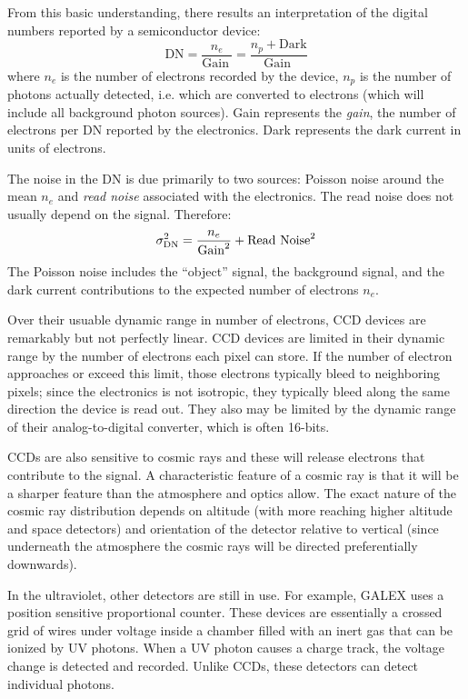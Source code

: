 From this basic understanding, there results an interpretation of the
digital numbers reported by a semiconductor device:
\begin{equation}
\mathrm{DN} =
\frac{n_e}{\mathrm{Gain~}} = 
\frac{n_p + \mathrm{Dark}}
{\mathrm{Gain~}}
\end{equation}
where $n_e$ is the number of electrons recorded by the device, $n_p$
is the number of photons actually detected, i.e. which are converted
to electrons (which will include all background photon sources). Gain
represents the {\it gain}, the number of electrons per DN reported by
the electronics. Dark represents the dark current in units of
electrons.

The noise in the DN is due primarily to two sources: Poisson noise
around the mean $n_e$ and {\it read noise} associated with the
electronics. The read noise does not usually depend on the
signal. Therefore:
\begin{equation}
\sigma_{\rm DN}^2 = \frac{n_e}{\mathrm{Gain}^2} + \mathrm{Read~Noise}^2
\end{equation}
The Poisson noise includes the ``object'' signal, the background
signal, and the dark current contributions to the expected number of
electrons $n_e$.

Over their usuable dynamic range in number of electrons, CCD devices
are remarkably but not perfectly linear.  CCD devices are limited in
their dynamic range by the number of electrons each pixel can
store. If the number of electron approaches or exceed this limit,
those electrons typically bleed to neighboring pixels; since the
electronics is not isotropic, they typically bleed along the same
direction the device is read out. They also may be limited by the
dynamic range of their analog-to-digital converter, which is often
16-bits.

CCDs are also sensitive to cosmic rays and these will release
electrons that contribute to the signal. A characteristic feature of a
cosmic ray is that it will be a sharper feature than the atmosphere
and optics allow. The exact nature of the cosmic ray distribution
depends on altitude (with more reaching higher altitude and space
detectors) and orientation of the detector relative to vertical (since
underneath the atmosphere the cosmic rays will be directed
preferentially downwards).

In the ultraviolet, other detectors are still in use. For example,
GALEX uses a position sensitive proportional counter. These devices
are essentially a crossed grid of wires under voltage inside a chamber
filled with an inert gas that can be ionized by UV photons. When a UV
photon causes a charge track, the voltage change is detected and
recorded. Unlike CCDs, these detectors can detect individual photons.

